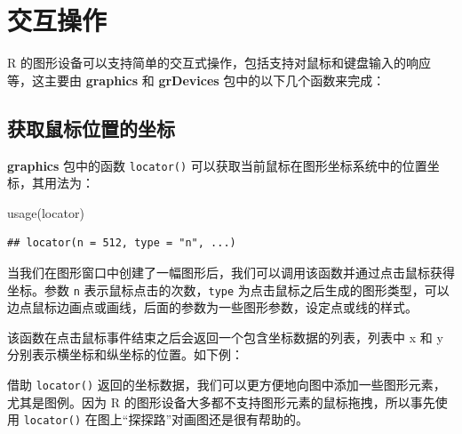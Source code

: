 \documentclass[
  b5paper,
  UTF8,twoside]{book}
\newenvironment{Shaded}{\begin{snugshade}}{\end{snugshade}}
\newcommand{\CommentTok}[1]{\textcolor[rgb]{0.56,0.35,0.01}{\textit{#1}}}
\newcommand{\DecValTok}[1]{\textcolor[rgb]{0.00,0.00,0.81}{#1}}
\newcommand{\FunctionTok}[1]{\textcolor[rgb]{0.00,0.00,0.00}{#1}}
\newcommand{\NormalTok}[1]{#1}
\begin{document}
\hypertarget{sec:interaction}{%
\section{交互操作}\label{sec:interaction}}

R 的图形设备可以支持简单的交互式操作，包括支持对鼠标和键盘输入的响应等，这主要由 \textbf{graphics} 和 \textbf{grDevices} 包中的以下几个函数来完成：

\hypertarget{ux83b7ux53d6ux9f20ux6807ux4f4dux7f6eux7684ux5750ux6807}{%
\subsection{获取鼠标位置的坐标}\label{ux83b7ux53d6ux9f20ux6807ux4f4dux7f6eux7684ux5750ux6807}}

\textbf{graphics} 包中的函数 \texttt{locator()} 可以获取当前鼠标在图形坐标系统中的位置坐标，其用法为：

\begin{Shaded}
\begin{Highlighting}[]
\FunctionTok{usage}\NormalTok{(locator)}
\end{Highlighting}
\end{Shaded}

\begin{verbatim}
## locator(n = 512, type = "n", ...)
\end{verbatim}

当我们在图形窗口中创建了一幅图形后，我们可以调用该函数并通过点击鼠标获得坐标。参数 \texttt{n} 表示鼠标点击的次数，\texttt{type} 为点击鼠标之后生成的图形类型，可以边点鼠标边画点或画线，后面的参数为一些图形参数，设定点或线的样式。

该函数在点击鼠标事件结束之后会返回一个包含坐标数据的列表，列表中 x 和 y 分别表示横坐标和纵坐标的位置。如下例：

\begin{Shaded}
\end{Shaded}

借助 \texttt{locator()} 返回的坐标数据，我们可以更方便地向图中添加一些图形元素，尤其是图例。因为 R 的图形设备大多都不支持图形元素的鼠标拖拽，所以事先使用 \texttt{locator()} 在图上``探探路''对画图还是很有帮助的。
\end{document}
